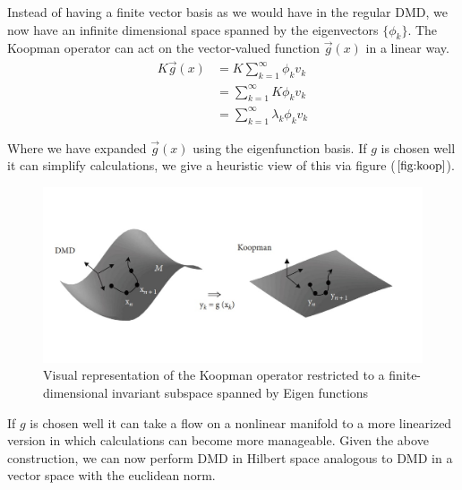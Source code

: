 \documentclass[12pt]{report}
\begin{document}
Instead of having a finite vector basis as we would have in the regular DMD,
we now have an infinite dimensional space spanned by the eigenvectors $%
\{\phi _{k}\}$. The Koopman operator can act on the vector-valued function $\vec{g%
}(x)$ in a linear way. 
\begin{equation}
    \begin{aligned}
    K\vec{g}(x) &=K\sum\limits_{k=1}^{\infty }\phi _{k}v_{k} \\
    &=\sum\limits_{k=1}^{\infty }K\phi _{k}v_{k} \\
    &=\sum\limits_{k=1}^{\infty }\lambda _{k}\phi _{k}v_{k}
    \end{aligned}
\end{equation}

Where we have expanded $\vec{g}(x)$ using the eigenfunction basis. If $g$ is chosen well it can simplify calculations, we give a heuristic view of this via figure ($\ref{fig:koop}$).

\begin{figure}[H]
    \centering
    \includegraphics[width=1\textwidth]{koop.jpg}
    \caption{Visual representation of the Koopman operator restricted to a finite-dimensional invariant subspace spanned by Eigen functions} \label{fig:koop}
\end{figure}
\noindent

If $g$ is chosen well it can take a flow on a nonlinear manifold to a
more linearized version in which calculations can become more manageable. Given the above construction, we can now perform DMD in Hilbert space
analogous to DMD in a vector space with the euclidean norm.
\end{document}
